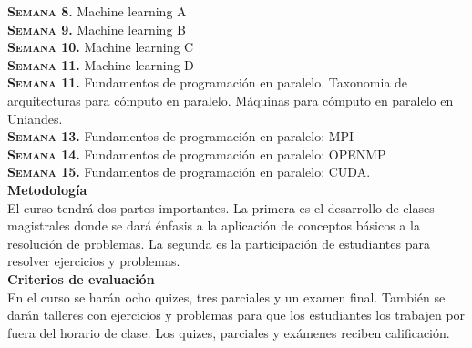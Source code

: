 \documentclass[letterpaper,10pt,onecolumn]{article}
\begin{document}
\noindent\textbf{\textsc{Semana 8.}}  Machine learning A
\\[-0.3cm] 

\noindent\textbf{\textsc{Semana 9.}}  Machine learning B
\\[-0.3cm] 

\noindent\textbf{\textsc{Semana 10.}}  Machine learning C
\\[-0.3cm]  

\noindent\textbf{\textsc{Semana 11.}}  Machine learning D
\\[-0.3cm]  

\noindent\textbf{\textsc{Semana 11.}} 
Fundamentos de programaci\'on en paralelo. Taxonomia de arquitecturas
para c\'omputo en paralelo. M\'aquinas para c\'omputo en paralelo en
Uniandes. 
\\[-0.3cm]  

\noindent\textbf{\textsc{Semana 13.}} 
Fundamentos de programaci\'on en paralelo: MPI
\\[-0.3cm] 

\noindent\textbf{\textsc{Semana 14.}} 
Fundamentos de programaci\'on en paralelo: OPENMP
\\[-0.3cm] 

\noindent\textbf{\textsc{Semana 15.}} Fundamentos de programaci\'on en
paralelo: CUDA.
\\[-0.1cm]  


\noindent\textbf{\large {} \quad
  Metodolog\'ia}\\[-0.2cm] 


\noindent\normalsize El curso tendr\'a dos partes importantes. La
primera es el desarrollo de clases magistrales donde se dar\'a
\'enfasis a la aplicaci\'on de conceptos b\'asicos a la resoluci\'on
de problemas. La segunda es la participaci\'on de estudiantes para
resolver ejercicios y problemas. \\[0.1cm]

\noindent\textbf{\large {} \quad Criterios de
  evaluaci\'on}\\[-0.2cm] 

En el curso se har\'an ocho quizes, tres parciales y un examen
final. Tambi\'en se dar\'an talleres con ejercicios y problemas para
que los estudiantes los trabajen por fuera del horario de
clase. Los quizes, parciales y ex\'amenes reciben
calificaci\'on. 
\end{document}
